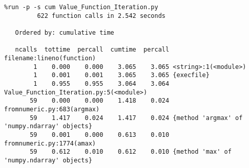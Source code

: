 \begin{verbatim}
%run -p -s cum Value_Function_Iteration.py
         622 function calls in 2.542 seconds
         
   Ordered by: cumulative time

   ncalls  tottime  percall  cumtime  percall filename:lineno(function)
        1    0.000    0.000    3.065    3.065 <string>:1(<module>)
        1    0.001    0.001    3.065    3.065 {execfile}
        1    0.955    0.955    3.064    3.064 Value_Function_Iteration.py:5(<module>)
       59    0.000    0.000    1.418    0.024 fromnumeric.py:683(argmax)
       59    1.417    0.024    1.417    0.024 {method 'argmax' of 'numpy.ndarray' objects}
       59    0.001    0.000    0.613    0.010 fromnumeric.py:1774(amax)
       59    0.612    0.010    0.612    0.010 {method 'max' of 'numpy.ndarray' objects}
\end{verbatim}
